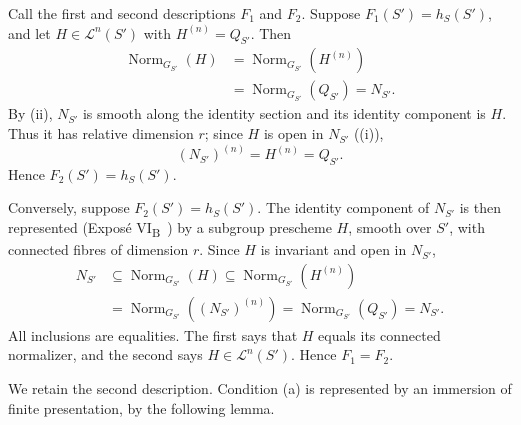 Call the first and second descriptions \(F_1\) and \(F_2\).
Suppose \(F_1(S')=h_S(S')\), and let \(H\in\mathcal L^n(S')\) with
\(H^{(n)}=Q_{S'}\). Then
\[
\begin{aligned}
\operatorname{Norm}_{G_{S'}}(H)
 &=\operatorname{Norm}_{G_{S'}}(H^{(n)})\\
 &=\operatorname{Norm}_{G_{S'}}(Q_{S'})
 =N_{S'}.
\end{aligned}
\]
By (ii), \(N_{S'}\) is smooth along the identity
section and its identity component is \(H\). Thus it has relative
dimension \(r\); since \(H\) is open in \(N_{S'}\) ((i)),
\[
  (N_{S'})^{(n)}=H^{(n)}=Q_{S'}.
\]
Hence \(F_2(S')=h_S(S')\).

Conversely, suppose \(F_2(S')=h_S(S')\). The identity component of
\(N_{S'}\) is then represented (Exposé VI\textsubscript{B}~) by
a subgroup prescheme \(H\), smooth over \(S'\), with connected fibres
of dimension \(r\). Since \(H\) is invariant and open in \(N_{S'}\),
\[
\begin{aligned}
N_{S'}&\subseteq\operatorname{Norm}_{G_{S'}}(H)
\subseteq\operatorname{Norm}_{G_{S'}}(H^{(n)})\\
&=\operatorname{Norm}_{G_{S'}}((N_{S'})^{(n)})
=\operatorname{Norm}_{G_{S'}}(Q_{S'})=N_{S'}.
\end{aligned}
\]
All inclusions are equalities. The first says that \(H\) equals its
connected normalizer, and the second says
\(H\in\mathcal L^n(S')\). Hence \(F_1=F_2\).

We retain the second description. Condition (a) is represented by an
immersion of finite presentation, by the following lemma.


